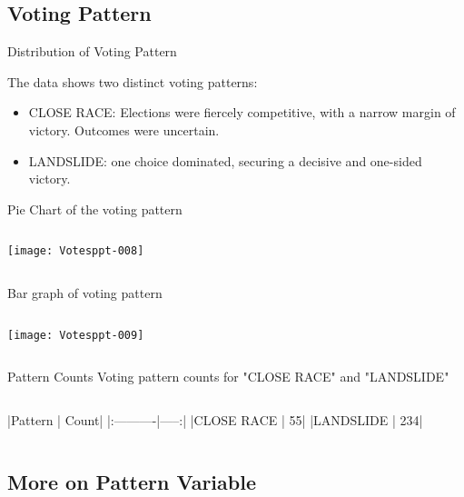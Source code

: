 \documentclass{beamer}
\begin{document}
\subsection{Voting Pattern}

\begin{frame}{Distribution of Voting Pattern}

The data shows two distinct voting patterns:

\begin{itemize}
\item CLOSE RACE: Elections were fiercely competitive, with a narrow margin of victory. Outcomes were uncertain.

\item LANDSLIDE: one choice dominated, securing a decisive and one-sided victory.
\end{itemize}
\end{frame}

\begin{frame}[fragile]{Pie Chart of the voting pattern}
\begin{columns}[c] %
\texttt{[image: Votesppt-008]}
\end{columns}
\end{frame}

\begin{frame}[fragile]{Bar graph of voting pattern}
\begin{columns}[c] %
\texttt{[image: Votesppt-009]}
\end{columns}
\end{frame}

\begin{frame}[fragile]{Pattern Counts}
Voting pattern counts for "CLOSE RACE" and "LANDSLIDE" 
\begin{columns}[c] %
\begin{Schunk}
\begin{Soutput}
|Pattern    | Count|
|:----------|-----:|
|CLOSE RACE |    55|
|LANDSLIDE  |   234|
\end{Soutput}
\end{Schunk}
\end{columns}
\end{frame}

\subsection{More on Pattern Variable}
\end{document}
